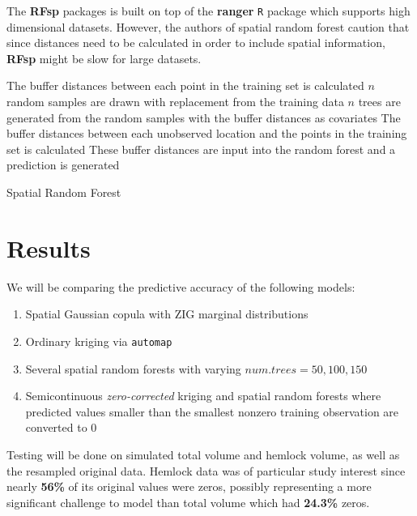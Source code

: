 \documentclass{article}
\begin{document}
The \textbf{RFsp} packages is built on top of the \textbf{ranger} \texttt{R} package which supports high dimensional datasets.
However, the authors of spatial random forest caution that since distances need to be calculated in order to include spatial information, \textbf{RFsp} might be slow for large datasets.

\vspace{.5cm}

\begin{singlespace}
\begin{algorithm}[H]
\SetAlgoLined
{}
 {
	The buffer distances between each point in the training set is calculated\; 
	$n$ random samples are drawn with replacement from the training data\;
	$n$ trees are generated from the random samples with the buffer distances as covariates\;
	The buffer distances between each unobserved location and the points in the training set is calculated\; 
	These buffer distances are input into the random forest and a prediction is generated\; 
}
	\caption{Spatial Random Forest}
\end{algorithm}
\end{singlespace}

\section{Results}
\begin{singlespace}
We will be comparing the predictive accuracy of the following models:
\begin{enumerate}
	\item Spatial Gaussian copula with ZIG marginal distributions
	\item Ordinary kriging via \texttt{automap}
	\item Several spatial random forests with varying $num.trees = 50, 100, 150$
	\item Semicontinuous \textit{zero-corrected} kriging and spatial random forests where predicted values smaller than the smallest nonzero training observation are converted to 0
\end{enumerate}
\end{singlespace}

Testing will be done on simulated total volume and hemlock volume, as well as the resampled original data.
Hemlock data was of particular study interest since nearly \textbf{56\%} of its original values were zeros, possibly representing a more significant challenge to model than total volume which had \textbf{24.3\%} zeros.
\end{document}
